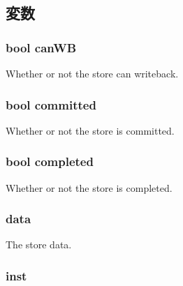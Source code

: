 \subsection{変数}
\hypertarget{structOzoneLSQ_1_1SQEntry_a2e445065a38a8a82256decf088cd3e6d}{
\subsubsection[{canWB}]{\setlength{\rightskip}{0pt plus 5cm}bool {\bf canWB}}}
\label{structOzoneLSQ_1_1SQEntry_a2e445065a38a8a82256decf088cd3e6d}
Whether or not the store can writeback. \hypertarget{structOzoneLSQ_1_1SQEntry_a28712f511a3687635fff96e084fdab9a}{
\subsubsection[{committed}]{\setlength{\rightskip}{0pt plus 5cm}bool {\bf committed}}}
\label{structOzoneLSQ_1_1SQEntry_a28712f511a3687635fff96e084fdab9a}
Whether or not the store is committed. \hypertarget{structOzoneLSQ_1_1SQEntry_a8c06e370b709d689e392a4b7b53b47c5}{
\subsubsection[{completed}]{\setlength{\rightskip}{0pt plus 5cm}bool {\bf completed}}}
\label{structOzoneLSQ_1_1SQEntry_a8c06e370b709d689e392a4b7b53b47c5}
Whether or not the store is completed. \hypertarget{structOzoneLSQ_1_1SQEntry_a075dba7fb6badd5634e3d6f7da55c239}{
\subsubsection[{data}]{ {\bf data}}}
\label{structOzoneLSQ_1_1SQEntry_a075dba7fb6badd5634e3d6f7da55c239}
The store data. \hypertarget{structOzoneLSQ_1_1SQEntry_af5d4fb974eeb4507d4c837d365d0cefc}{
\subsubsection[{inst}]{ {\bf inst}}}
